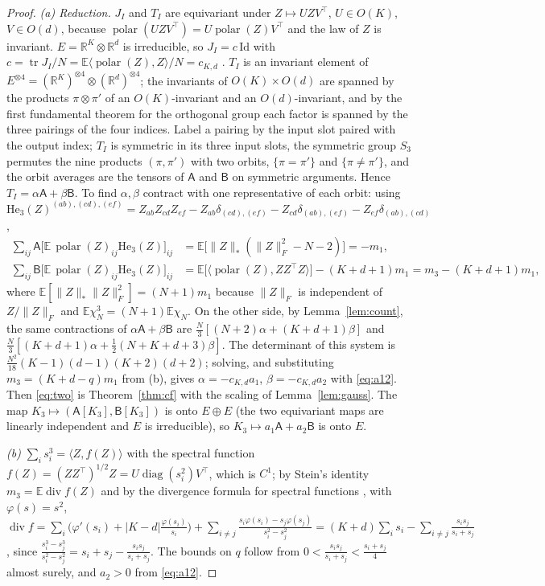 \documentclass[10pt]{article}
\theoremstyle{definition}
\theoremstyle{remark}
\newcommand{\R}{\mathbb{R}}
\newcommand{\E}{\mathbb{E}}
\newcommand{\nnuc}[1]{\|#1\|_{*}}
\newcommand{\nF}[1]{\|#1\|_{F}}
\newcommand{\inner}[2]{\langle #1, #2\rangle}
\newcommand{\tr}{\operatorname{tr}}
\newcommand{\polar}{\operatorname{polar}}
\newcommand{\He}{\mathrm{He}}
\newcommand{\cA}{\mathsf{A}}
\newcommand{\cB}{\mathsf{B}}
\begin{document}
\begin{proof}
\emph{(a) Reduction.} $J_I$ and $T_I$ are equivariant under $Z\mapsto UZV^\top$, $U\in O(K)$, $V\in O(d)$, because
$\polar(UZV^\top)=U\polar(Z)V^\top$ and the law of $Z$ is invariant. $E=\R^K\otimes\R^d$ is irreducible, so
$J_I=c\,\mathrm{Id}$ with $c=\tr J_I/N=\E\inner{\polar(Z)}Z/N=c_{K,d}$ \cite{xie,chen}. $T_I$ is an invariant element of
$E^{\otimes4}=(\R^K)^{\otimes4}\otimes(\R^d)^{\otimes4}$; the invariants of $O(K)\times O(d)$ are spanned by the
products $\pi\otimes\pi'$ of an $O(K)$-invariant and an $O(d)$-invariant, and by the first fundamental theorem for the
orthogonal group each factor is spanned by the three pairings of the four indices. Label a pairing by the input slot
paired with the output index; $T_I$ is symmetric in its three input slots, the symmetric group $S_3$ permutes the nine
products $(\pi,\pi')$ with two orbits, $\{\pi=\pi'\}$ and $\{\pi\ne\pi'\}$, and the orbit averages are the tensors of
$\cA$ and $\cB$ on symmetric arguments. Hence $T_I=\alpha\cA+\beta\cB$. To find $\alpha,\beta$ contract with one representative of each orbit:
using $\He_3(Z)^{(ab),(cd),(ef)}=Z_{ab}Z_{cd}Z_{ef}-Z_{ab}\delta_{(cd),(ef)}-Z_{cd}\delta_{(ab),(ef)}-Z_{ef}\delta_{(ab),(cd)}$,
\begin{align*}
\textstyle\sum_{ij}\cA\big[\E\,\polar(Z)_{ij}\He_3(Z)\big]_{ij}&=\E\big[\nnuc Z(\nF Z^2-N-2)\big]=-m_1,\\
\textstyle\sum_{ij}\cB\big[\E\,\polar(Z)_{ij}\He_3(Z)\big]_{ij}&=\E\big[\inner{\polar(Z)}{ZZ^\top Z}\big]-(K+d+1)m_1=m_3-(K+d+1)m_1,
\end{align*}
where $\E[\nnuc Z\nF Z^2]=(N+1)m_1$ because $\nF Z$ is independent of $Z/\nF Z$ and $\E\chi_N^3=(N+1)\E\chi_N$. On the
other side, by Lemma~\ref{lem:count}, the same contractions of $\alpha\cA+\beta\cB$ are
$\frac N3[(N+2)\alpha+(K+d+1)\beta]$ and $\frac N3[(K+d+1)\alpha+\frac12(N+K+d+3)\beta]$. The determinant of this system
is $\frac{N^2}{18}(K-1)(d-1)(K+2)(d+2)$; solving, and substituting $m_3=(K+d-q)m_1$ from (b), gives
$\alpha=-c_{K,d}a_1$, $\beta=-c_{K,d}a_2$ with \eqref{eq:a12}. Then \eqref{eq:two} is Theorem~\ref{thm:cf} with the scaling
of Lemma~\ref{lem:gauss}. The map $K_3\mapsto(\cA[K_3],\cB[K_3])$ is onto $E\oplus E$ (the two equivariant maps are
linearly independent and $E$ is irreducible), so $K_3\mapsto a_1\cA+a_2\cB$ is onto $E$.

\emph{(b)} $\sum_is_i^3=\inner Z{f(Z)}$ with the spectral function $f(Z)=(ZZ^\top)^{1/2}Z=U\operatorname{diag}(s_i^2)V^\top$,
which is $C^1$; by Stein's identity $m_3=\E\operatorname{div}f(Z)$ and by the divergence formula for spectral functions
\cite{candes}, with $\varphi(s)=s^2$,
$\operatorname{div}f=\sum_i\big(\varphi'(s_i)+|K-d|\frac{\varphi(s_i)}{s_i}\big)+\sum_{i\ne j}\frac{s_i\varphi(s_i)-s_j\varphi(s_j)}{s_i^2-s_j^2}
=(K+d)\sum_is_i-\sum_{i\ne j}\frac{s_is_j}{s_i+s_j}$, since
$\frac{s_i^3-s_j^3}{s_i^2-s_j^2}=s_i+s_j-\frac{s_is_j}{s_i+s_j}$. The bounds on $q$ follow from
$0<\frac{s_is_j}{s_i+s_j}<\frac{s_i+s_j}4$ almost surely, and $a_2>0$ from \eqref{eq:a12}.


\end{proof}
\end{document}
